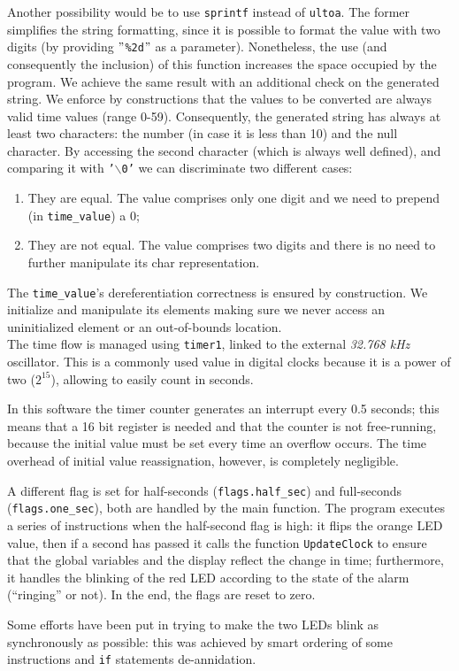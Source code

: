 Another possibility would be to use \texttt{sprintf} instead of \texttt{ultoa}. The former simplifies the string formatting, since it is possible to format the value with two digits (by providing \texttt{$"$\%2d$"$} as a parameter). Nonetheless, the use (and consequently the inclusion) of this function increases the space occupied by the program. We achieve the same result with an additional check on the generated string. We enforce by constructions that the values to be converted are always valid time values (range 0-59). Consequently, the generated string has always at least two characters: the number (in case it is less than 10) and the null character. By accessing the second character (which is always well defined), and comparing it with \texttt{'$\backslash$0'} we can discriminate two different cases:
\begin{enumerate}
	\item They are equal. The value comprises only one digit and we need to prepend (in \texttt{time\_value}) a $0$;
	\item They are not equal. The value comprises two digits and there is no need to further manipulate its char representation.
\end{enumerate}
The \texttt{time\_value}'s dereferentiation correctness is ensured by construction. We initialize and manipulate its elements making sure we never access an uninitialized element or an out-of-bounds location.\\

The time flow is managed using \texttt{timer1}, linked to the external \textit{32.768 kHz} oscillator. This is a commonly used value in digital clocks because it is a power of two ($2^{15}$), allowing to easily count in seconds.

In this software the timer counter generates an interrupt every 0.5 seconds; this means that a 16 bit register is needed and that the counter is not free-running, because the initial value must be set every time an overflow occurs. The time overhead of initial value reassignation, however, is completely negligible.

A different flag is set for half-seconds (\texttt{flags.half\_sec}) and full-seconds (\texttt{flags.one\_sec}), both are handled by the main function.
The program executes a series of instructions when the half-second flag is high: it flips the orange LED value, then if a second has passed it calls the function \texttt{UpdateClock} to ensure that the global variables and the display reflect the change in time; furthermore, it handles the blinking of the red LED according to the state of the alarm (``ringing'' or not). In the end, the flags are reset to zero.

Some efforts have been put in trying to make the two LEDs blink as synchronously as possible: this was achieved by smart ordering of some instructions and \texttt{if} statements de-annidation.